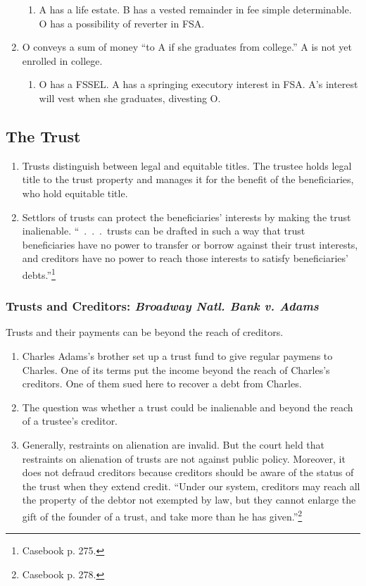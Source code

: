 \begin{enumerate}
\begin{enumerate}
        \item A has a life estate. B has a vested remainder in fee simple 
        determinable. O has a possibility of reverter in FSA.
    \end{enumerate}
    \item O conveys a sum of money ``to A if she graduates from college.'' A 
    is not yet enrolled in college.
    \begin{enumerate}
        \item O has a FSSEL. A has a springing executory interest in FSA. A's 
        interest will vest when she graduates, divesting O.
    \end{enumerate}
\end{enumerate}

\subsection{The Trust}

\begin{enumerate}
    \item Trusts distinguish between legal and equitable titles. The trustee 
    holds legal title to the trust property and manages it for the benefit of 
    the beneficiaries, who hold equitable title.
    \item Settlors of trusts can protect the beneficiaries' interests by 
    making the trust inalienable. ``~.~.~.~trusts can be drafted in such a way 
    that trust beneficiaries have no power to transfer or borrow against their 
    trust interests, and creditors have no power to reach those interests to 
    satisfy beneficiaries' debts.''\footnote{Casebook p. 275.}
\end{enumerate}

\subsubsection{Trusts and Creditors: \emph{Broadway Natl. Bank v. Adams}}

Trusts and their payments can be beyond the reach of creditors.

\begin{enumerate}
    \item Charles Adams's brother set up a trust fund to give regular paymens 
    to Charles. One of its terms put the income beyond the reach of Charles's 
    creditors. One of them sued here to recover a debt from Charles.
    \item The question was whether a trust could be inalienable and beyond the 
    reach of a trustee's creditor.
    \item Generally, restraints on alienation are invalid. But the court held 
    that restraints on alienation of trusts are not against public policy. 
    Moreover, it does not defraud creditors because creditors should be aware 
    of the status of the trust when they extend credit. ``Under our system, 
    creditors may reach all the property of the debtor not exempted by law, 
    but they cannot enlarge the gift of the founder of a trust, and take more 
    than he has given.''\footnote{Casebook p. 278.}
\end{enumerate}

